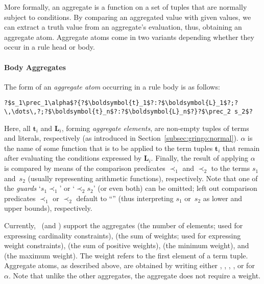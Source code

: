 More formally,
an aggregate is a function on a set of tuples that are normally subject to conditions.
By comparing an aggregated value with given values, we can extract a truth value from an aggregate's evaluation,
thus, obtaining an aggregate atom.
Aggregate atoms come in two variants depending whether they occur in a rule head or body.

\paragraph{Body Aggregates}
The form of an \emph{aggregate atom} occurring in a rule body is as follows:
%
\begin{lstlisting}[numbers=none,escapechar=?]
?$s_1\prec_1\alpha$?{?$\boldsymbol{t}_1$?:?$\boldsymbol{L}_1$?;?\,\dots\,?;?$\boldsymbol{t}_n$?:?$\boldsymbol{L}_n$?}?$\prec_2 s_2$?
\end{lstlisting}
%
Here, all $\boldsymbol{t}_i$ and $\boldsymbol{L}_i$, forming \emph{aggregate elements}, are non-empty tuples of terms and literals, respectively
(as introduced in Section~\ref{subsec:gringo:normal}).
$\alpha$ is the name of some function that is to be applied to the term tuples $\boldsymbol{t}_i$
that remain after evaluating the conditions expressed by $\boldsymbol{L}_i$.
%
Finally,
the result of applying $\alpha$ is compared by means of the comparison predicates $\prec_1$ and $\prec_2$
to the terms $s_1$ and~$s_2$ (usually representing arithmetic functions), respectively.
Note that one of the \emph{guards} `$s_1\prec_1$' or `$\prec_2 s_2$'%
(or even both) can be omitted;
left out comparison predicates $\prec_1$ or $\prec_2$ default to ``\code{<=}'' (thus interpreting $s_1$ or~$s_2$ as lower and upper bounds),
respectively.

Currently, \gringo\ (and \clingo) support the aggregates
%
(the number of elements; used for expressing cardinality constraints),
%
(the sum of weights; used for expressing weight constraints),
%
(the sum of positive weights),
%
(the minimum weight), and
%
(the maximum weight).
The weight refers to the first element of a term tuple.
Aggregate atoms, as described above, are obtained by writing
either , , , , or  for $\alpha$.
%
Note that unlike the other aggregates, the  aggregate does not require a weight.

